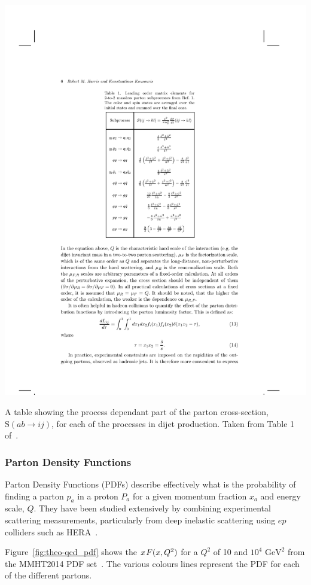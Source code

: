 \begin{table}[!hbt]
  \begin{center}
    \includegraphics[width=0.7\linewidth, angle=0]{figs/Theory/qcd_dijet_stable.pdf}
  \end{center}
  \caption[A table showing the process dependant part of the parton cross-section, $\text{S}(ab \to ij)$, for each of the processes in dijet production.]
  {A table showing the process dependant part of the parton cross-section, $\text{S}(ab \to ij)$, for each of the processes in dijet production. Taken from Table 1 of~\cite{theo-dijet_harris}.}
  \label{tab:theo-qcd_dijet_s}
\end{table}

\newpage
\subsubsection{Parton Density Functions}
\label{sec:theo-qcd_pdf}

Parton Density Functions (PDFs) describe effectively what is the probability of finding a parton $p_a$ in a proton $P_a$
for a given momentum fraction $x_a$ and energy scale, $Q$.
They have been studied extensively
by combining experimental scattering measurements,
particularly from deep inelastic scattering using $ep$ colliders such as HERA~\cite{theo-qcd_hera}.

Figure~\ref{fig:theo-qcd_pdf} shows the $x\hspace{0.3mm}F(x,Q^2)$ for a $Q^2$ of 10 and $10^4$ $\text{GeV}^2$
from the MMHT2014 PDF set~\cite{theo-qcd_pdf}.
The various colours lines represent the PDF for each of the different partons.

